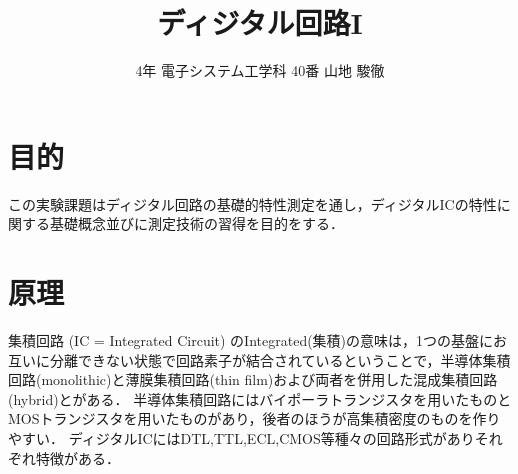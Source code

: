 \documentclass[10pt, a4j, dvipdfmx]{jarticle}
\title{ディジタル回路I}
\author{4年 電子システム工学科 40番  山地 駿徹}
\begin{document}

\section{目的}
この実験課題はディジタル回路の基礎的特性測定を通し，ディジタルICの特性に関する基礎概念並びに測定技術の習得を目的をする．

\section{原理}
集積回路 (IC = Integrated Circuit) のIntegrated(集積)の意味は，1つの基盤にお互いに分離できない状態で回路素子が結合されているということで，半導体集積回路(monolithic)と薄膜集積回路(thin film)および両者を併用した混成集積回路(hybrid)とがある．
半導体集積回路にはバイポーラトランジスタを用いたものとMOSトランジスタを用いたものがあり，後者のほうが高集積密度のものを作りやすい．
ディジタルICにはDTL,TTL,ECL,CMOS等種々の回路形式がありそれぞれ特徴がある．
\end{document}
